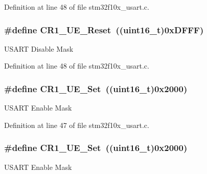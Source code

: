 Definition at line 48 of file stm32f10x\+\_\+usart.\+c.

\subsubsection[{\texorpdfstring{C\+R1\+\_\+\+U\+E\+\_\+\+Reset}{CR1_UE_Reset}}]{\setlength{\rightskip}{0pt plus 5cm}\#define C\+R1\+\_\+\+U\+E\+\_\+\+Reset~(({\bf uint16\+\_\+t})0x\+D\+F\+F\+F)}\hypertarget{group___u_s_a_r_t___private___defines_ga9c75a44192cb3dbbbf509cddfc47481c}{}\label{group___u_s_a_r_t___private___defines_ga9c75a44192cb3dbbbf509cddfc47481c}
U\+S\+A\+RT Disable Mask 

Definition at line 48 of file stm32f10x\+\_\+usart.\+c.

\subsubsection[{\texorpdfstring{C\+R1\+\_\+\+U\+E\+\_\+\+Set}{CR1_UE_Set}}]{\setlength{\rightskip}{0pt plus 5cm}\#define C\+R1\+\_\+\+U\+E\+\_\+\+Set~(({\bf uint16\+\_\+t})0x2000)}\hypertarget{group___u_s_a_r_t___private___defines_ga95f5821be56b1a5dbfdd38fdb37ed54c}{}\label{group___u_s_a_r_t___private___defines_ga95f5821be56b1a5dbfdd38fdb37ed54c}
U\+S\+A\+RT Enable Mask 

Definition at line 47 of file stm32f10x\+\_\+usart.\+c.

\subsubsection[{\texorpdfstring{C\+R1\+\_\+\+U\+E\+\_\+\+Set}{CR1_UE_Set}}]{\setlength{\rightskip}{0pt plus 5cm}\#define C\+R1\+\_\+\+U\+E\+\_\+\+Set~(({\bf uint16\+\_\+t})0x2000)}\hypertarget{group___u_s_a_r_t___private___defines_ga95f5821be56b1a5dbfdd38fdb37ed54c}{}\label{group___u_s_a_r_t___private___defines_ga95f5821be56b1a5dbfdd38fdb37ed54c}
U\+S\+A\+RT Enable Mask 

